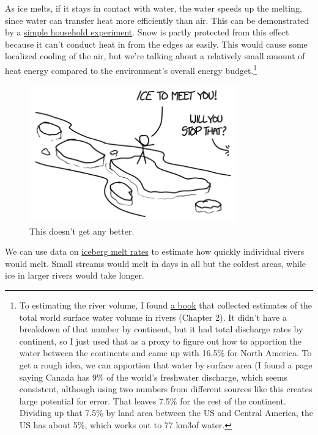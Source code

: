 {{{{As ice melts, if it stays in contact with water, the water speeds up the melting, since water can transfer heat more efficiently than air. This can be demonstrated by a \href{http://www.cockeyed.com/science/moment/colander.shtml}{simple household experiment}. Snow is partly protected from this effect because it can't conduct heat in from the edges as easily.} } This would cause some localized cooling of the air, but we're talking about a relatively small amount of heat energy compared to the environment's overall energy budget.{\footnote{To estimating the river volume, I found \href{http://www.amazon.com/Water-Crisis-Guide-Worlds-Resources/dp/0195076281}{a book} that collected estimates of the total world surface water volume in rivers (Chapter 2). It didn't have a breakdown of that number by continent, but it had total discharge rates by continent, so I just used that as a proxy to figure out how to apportion the water between the continents and came up with 16.5\% for North America. To get a rough idea, we can apportion that water by surface area (I found a page saying Canada has 9\% of the world's freshwater discharge, which seems consistent, although using two numbers from different sources like this creates large potential for error. That leaves 7.5\% for the rest of the continent. Dividing up that 7.5\% by land area between the US and Central America, the US has about 5\%, which works out to 77 km3of water.} } }

\begin{figure}[!htbp]
\centering
\includegraphics[scale=0.5, max width=0.8\textwidth]{imgs/a/121/iceto.png}
\caption{This doesn't get any better.}
\end{figure}

{We can use data on \href{http://journals.ametsoc.org/doi/pdf/10.1175/1520-0485\%281980\%29010\%3C1681\%3AOTEOAI\%3E2.0.CO\%3B2}{iceberg melt rates} to estimate how quickly individual rivers would melt. Small streams would melt in days in all but the coldest areas, while ice in larger rivers would take longer.}

}
